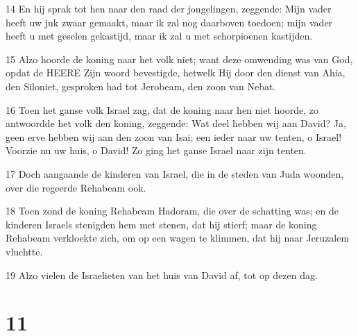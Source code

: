 \par 14 En hij sprak tot hen naar den raad der jongelingen, zeggende: Mijn vader heeft uw juk zwaar gemaakt, maar ik zal nog daarboven toedoen; mijn vader heeft u met geselen gekastijd, maar ik zal u met schorpioenen kastijden.
\par 15 Alzo hoorde de koning naar het volk niet; want deze omwending was van God, opdat de HEERE Zijn woord bevestigde, hetwelk Hij door den dienst van Ahia, den Siloniet, gesproken had tot Jerobeam, den zoon van Nebat.
\par 16 Toen het ganse volk Israel zag, dat de koning naar hen niet hoorde, zo antwoordde het volk den koning, zeggende: Wat deel hebben wij aan David? Ja, geen erve hebben wij aan den zoon van Isai; een ieder naar uw tenten, o Israel! Voorzie nu uw huis, o David! Zo ging het ganse Israel naar zijn tenten.
\par 17 Doch aangaande de kinderen van Israel, die in de steden van Juda woonden, over die regeerde Rehabeam ook.
\par 18 Toen zond de koning Rehabeam Hadoram, die over de schatting was; en de kinderen Israels stenigden hem met stenen, dat hij stierf; maar de koning Rehabeam verkloekte zich, om op een wagen te klimmen, dat hij naar Jeruzalem vluchtte.
\par 19 Alzo vielen de Israelieten van het huis van David af, tot op dezen dag.

\chapter{11}

